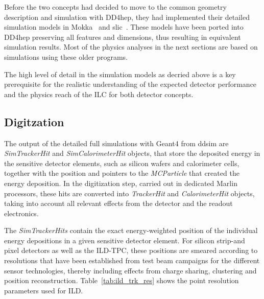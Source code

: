 Before the two concepts had decided to move to the common geometry description and simulation with DD4hep, they had
implemented their detailed simulation models in Mokka~\cite{MoradeFreitas:2002kj} and slic~\cite{bib:slic}. These models
have been ported into DD4hep preserving all features and dimensions, thus resulting in equivalent simulation results.
Most of the physics analyses in the next sections are based on simulations using these older programs.

The high level of detail in the simulation models as decried above is a key prerequisite for the
realistic understanding of the expected detector performance and the physics reach of the ILC for both detector concepts.


\subsection{\label{sub:sw-digi}Digitzation}

The output of the detailed full simulations with Geant4 from ddsim are \emph{SimTrackerHit} and \emph{SimCalorimeterHit} objects,
that store the deposited energy in the sensitive detector elements, such as silicon wafers and calorimeter cells, together with
the position and pointers to the \emph{MCParticle} that created the energy deposition. In the digitization step, carried out in dedicated
Marlin processors, these hits are converted into \emph{TrackerHit} and \emph{CalorimeterHit} objects,
taking into account all relevant effects from the detector and the readout electronics.

The \emph{SimTrackerHits} contain the exact energy-weighted position of the individual energy depositions in a given sensitive
detector element. For silicon strip-and pixel detectors as well as the ILD-TPC, these positions are smeared according to
resolutions that have been established from test beam campaigns for the different sensor technologies, thereby including effects
from charge sharing, clustering and position reconstruction. Table~\ref{tab:ild_trk_res} shows the point resolution parameters used for ILD.



